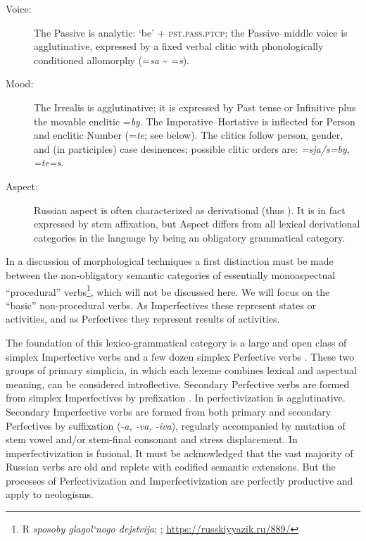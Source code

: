 \documentclass[output=paper, colorlinks,citecolor=brown]{langsci/langscibook}
\begin{document}
\begin{description}
\item[Voice:] The Passive is analytic: ‘be' + \textsc{pst.pass.ptcp}; the Passive–middle voice is agglutinative, expressed by a fixed verbal clitic with phonologically conditioned allomorphy (=\textit{s{\textquotesingle}a} {\textasciitilde} =\textit{s}{\textquotesingle}).

\item[Mood:] The Irrealis is agglutinative; it is expressed by Past tense or Infinitive plus the movable enclitic =\textit{by}. The Imperative–Hortative is inflected for Person and enclitic Number (=\textit{te}; see below). The clitics follow person, gender, and (in participles) case desinences; possible clitic orders are: \textit{=sja/s{\textquotesingle}=by}, \textit{=te=s{\textquotesingle}}.

\item[Aspect:] Russian aspect is often characterized as derivational (thus ). It is in fact expressed by stem affixation, but Aspect differs from all lexical derivational categories in the language by being an obligatory grammatical category. 
\end{description}

In a discussion of morphological techniques a first distinction must be made between the non-obligatory semantic categories of essentially monoaspectual “procedural” verbs\footnote{R \textit{sposoby glagol`nogo dejstvija}; \citet[385--418]{Issatschenko1962}; \url{https://russkiyyazik.ru/889/}}, which will not be discussed here. We will focus on the “basic” non-procedural verbs. As Imperfectives these represent states or activities, and as Perfectives they represent results of activities. 

The foundation of this lexico-grammatical category is a large and open class of simplex Imperfective verbs  and a few dozen simplex Perfective verbs  \citep[352–355, 381–385]{Issatschenko1962}. These two groups of primary simplicia, in which each lexeme combines lexical and aspectual meaning, can be considered introflective. Secondary Perfective verbs are formed from simplex Imperfectives by prefixation \citep{JandaEtAl2013}. In  perfectivization is agglutinative. Secondary Imperfective verbs are formed from both primary and secondary Perfectives by suffixation (\textit{-a, -va, -iva}), regularly accompanied by mutation of stem vowel and/or stem-final consonant and stress displacement. In  imperfectivization is fusional. It must be acknowledged that the vast majority of Russian verbs are old and replete with codified semantic extensions. But the processes of Perfectivization  and Imperfectivization  are perfectly productive and apply to neologisms. 
\end{document}
